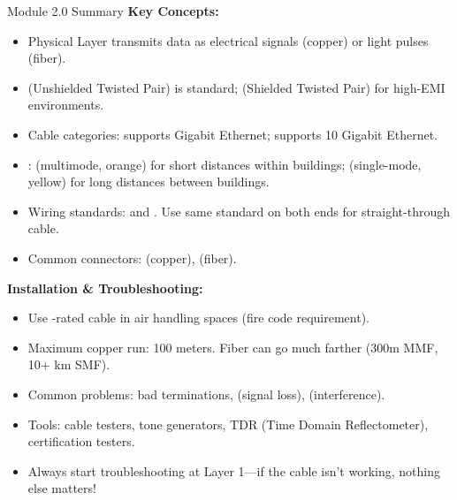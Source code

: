 \documentclass[aspectratio=169]{beamer}  %
\begin{document}
\begin{frame}[t,allowframebreaks]{Module 2.0 Summary}
    \small
    \textbf{Key Concepts:}
    \begin{itemize}
        \item Physical Layer transmits data as electrical signals (copper) or light pulses (fiber).
        \item {} (Unshielded Twisted Pair) is standard;  (Shielded Twisted Pair) for high-EMI environments.
        \item Cable categories:  supports Gigabit Ethernet;  supports 10 Gigabit Ethernet.
        \item {}:  (multimode, orange) for short distances within buildings;  (single-mode, yellow) for long distances between buildings.
        \item Wiring standards:  and . Use same standard on both ends for straight-through cable.
        \item Common connectors:  (copper),  (fiber).
    \end{itemize}
    \framebreak
    
    \vspace{0.3em}
    \textbf{Installation \& Troubleshooting:}
    \begin{itemize}
        \item Use -rated cable in air handling spaces (fire code requirement).
        \item Maximum copper run: 100 meters. Fiber can go much farther (300m MMF, 10+ km SMF).
        \item Common problems: bad terminations,  (signal loss),  (interference).
        \item Tools: cable testers, tone generators, TDR (Time Domain Reflectometer), certification testers.
        \item Always start troubleshooting at Layer 1---if the cable isn't working, nothing else matters!
    \end{itemize}
\end{frame}

\end{document}
